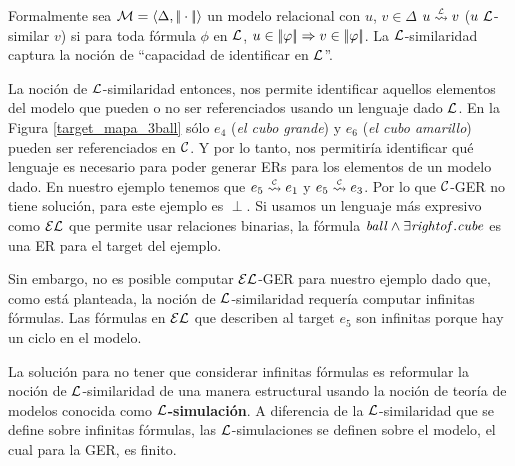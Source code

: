 
Formalmente sea $\mathcal{M} = \langle \Delta, |\!|\cdot|\!| \rangle$ un modelo relacional con $u$, $v \in \Delta$
$u \simil{\+L} v$ ($u~\mathcal{L}$-similar $v$) si para toda f\'ormula $\phi$ en $\mathcal{L}$, $u \in |\!|\varphi|\!| \Rightarrow v \in |\!|\varphi|\!|$. 
La $\mathcal{L}$-similaridad captura la noci\'on de ``capacidad de identificar en $\mathcal{L}$''. 

%
%
%

La noci\'on de $\mathcal{L}$-similaridad entonces, nos permite identificar aquellos elementos del modelo que pueden o no ser referenciados usando un lenguaje dado $\mathcal{L}$. En 
la Figura \ref{target_mapa_3ball} s\'olo $e_4$ ({\it el cubo grande}) y $e_6$ ({\it el cubo amarillo}) pueden ser referenciados en $\mathcal{C}$. Y por lo tanto, nos permitir\'ia identificar qu\'e lenguaje es necesario para poder generar ERs para los elementos de un modelo dado. En nuestro ejemplo tenemos que $e_5 \simil{\+C} e_1$ y $e_5 \simil{\+C} e_3$. Por lo que $\mathcal{C}$-GER no tiene soluci\'on, para este ejemplo es $\perp$. Si usamos un lenguaje m\'as expresivo como $\mathcal{EL}$ que permite usar relaciones binarias, la f\'ormula $\mathit{ball} \land \exists\mathit{rightof}. \mathit{cube}$ es una ER para el target del ejemplo. 

Sin embargo, no es posible computar $\mathcal{EL}$-GER para nuestro ejemplo dado que, como est\'a planteada, la noci\'on de $\mathcal{L}$-similaridad requer\'ia computar infinitas f\'ormulas. Las f\'ormulas en $\mathcal{EL}$ que describen al target $e_5$ son infinitas porque hay un ciclo en el modelo.

La soluci\'on para no tener que considerar infinitas f\'ormulas es reformular la noci\'on de $\mathcal{L}$-similaridad de una manera estructural usando la noci\'on de teor\'ia de modelos conocida como {\bf $\mathcal{L}$-simulaci\'on}. A diferencia de la $\mathcal{L}$-similaridad que se define sobre infinitas f\'ormulas, las $\mathcal{L}$-simulaciones se definen sobre el modelo, el cual para la GER, es finito.

